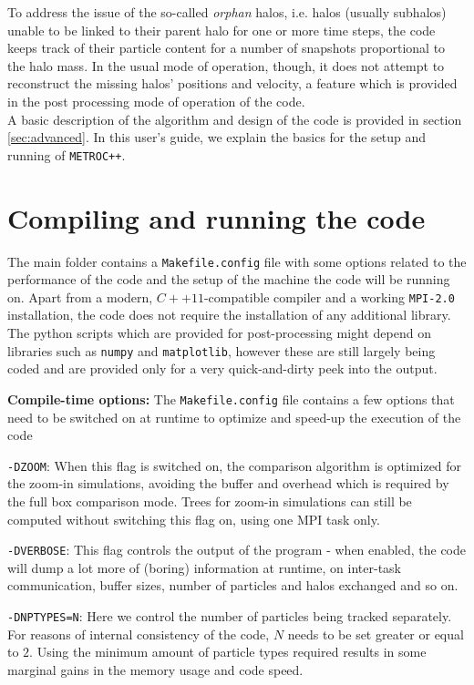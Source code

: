 \documentclass{article}
\begin{document}
To address the issue of the so-called \emph{orphan} halos, i.e. halos (usually subhalos) unable to be linked to their parent 
halo for one or more time steps, the code keeps track of their particle content for a number of snapshots proportional to the
halo mass. In the usual mode of operation, though, it does not attempt to reconstruct the missing halos' positions and
velocity, a feature which is provided in the post processing mode of operation of the code.\\

A basic description of the algorithm and design of the code is provided in section \ref{sec:advanced}.
In this user's guide, we explain the basics for the setup and running of \texttt{METROC++}.


\section{Compiling and running the code}

The main folder contains a \texttt{Makefile.config} file with some options related to the performance of the code and the 
setup of the machine the code will be running on. Apart from a modern, $C++11$-compatible compiler and a working 
\texttt{MPI-2.0} installation, the code does not require the installation of any additional library.
The python scripts which are provided for post-processing might depend on libraries such as \texttt{numpy} and \texttt{matplotlib},
however these are still largely being coded and are provided only for a very quick-and-dirty peek into the output.

\noindent
\textbf{Compile-time options:} The \texttt{Makefile.config} file contains a few options that need to be switched on at runtime 
to optimize and speed-up the execution of the code

\noindent
\texttt{-DZOOM}: When this flag is switched on, the comparison algorithm is optimized for the 
zoom-in simulations, avoiding the buffer and overhead which is required by the full box comparison mode. 
Trees for zoom-in simulations can still be computed without switching this flag on, using one MPI task only.

\noindent
\texttt{-DVERBOSE}: This flag controls the output of the program - when enabled, the code will dump a lot more of 
(boring) information at runtime, on inter-task communication, buffer sizes, number of particles and halos exchanged and so on.

\noindent
\texttt{-DNPTYPES=N}: Here we control the number of particles being tracked separately. For reasons of internal consistency 
of the code, $N$ needs to be set greater or equal to $2$. Using the minimum amount of particle types required results in some marginal
gains in the memory usage and code speed.
\end{document}
